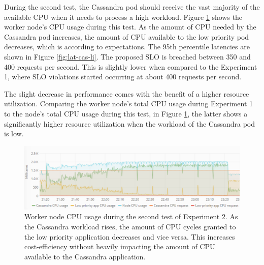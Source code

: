 %
During the second test, the Cassandra pod should receive the vast majority of the available CPU when it needs to process a high workload. Figure \ref{fig:cpu-cas-lpp-li-2} shows the worker node's CPU usage during this test. As the amount of CPU needed by the Cassandra pod increases, the amount of CPU available to the low priority pod decreases, which is according to expectations. The 95th percentile latencies are shown in Figure \ref{fig:lat-cas-li}. The proposed SLO is breached between 350 and 400 requests per second. This is slightly lower when compared to the Experiment 1, where SLO violations started occurring at about 400 requests per second.


The slight decrease in performance comes with the benefit of a higher resource utilization. Comparing the worker node's total CPU usage during Experiment 1 to the node's total CPU usage during this test, in Figure \ref{fig:cpu-cas-lpp-li-2}, the latter shows a significantly higher resource utilization when the workload of the Cassandra pod is low.

\begin{figure}
\centering
\includegraphics[width=\columnwidth]{Images/Experiments/CPU/Grafana/cpu-cas-lpp-li-2.PNG}
\caption{Worker node CPU usage during the second test of Experiment 2. As the Cassandra workload rises, the amount of CPU cycles granted to the low priority application decreases and vice versa. This increases cost-efficiency without heavily impacting the amount of CPU available to the Cassandra application.}
\label{fig:cpu-cas-lpp-li-2}
\end{figure}

